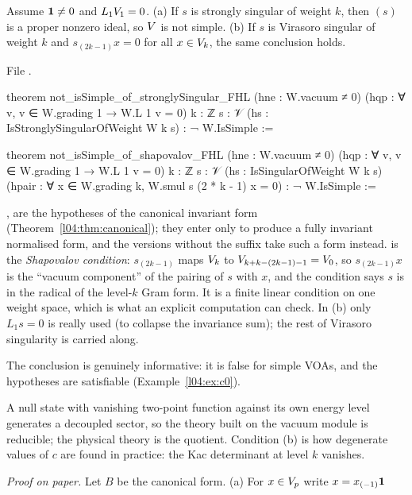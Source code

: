 \begin{theorem}\label{l04:thm:notsimple}
Assume $\mathbf{1}\ne0$ and $L_1V_1 = 0$. (a) If $s$ is strongly singular of weight $k$, then $(s)$ is
a proper nonzero ideal, so $V$ is not simple. (b) If $s$ is Virasoro singular of weight $k$ and
$s_{(2k-1)}x = 0$ for all $x\in V_k$, the same conclusion holds.
\end{theorem}
\noindent File .
\begin{leancode}
theorem not_isSimple_of_stronglySingular_FHL (hne : W.vacuum ≠ 0)
    (hqp : ∀ v, v ∈ W.grading 1 → W.L 1 v = 0) {k : ℤ} {s : 𝒱}
    (hs : IsStronglySingularOfWeight W k s) : ¬ W.IsSimple :=

theorem not_isSimple_of_shapovalov_FHL (hne : W.vacuum ≠ 0)
    (hqp : ∀ v, v ∈ W.grading 1 → W.L 1 v = 0) {k : ℤ} {s : 𝒱} (hs : IsSingularOfWeight W k s)
    (hpair : ∀ x ∈ W.grading k, W.smul s (2 * k - 1) x = 0) : ¬ W.IsSimple :=
\end{leancode}
\begin{dictionary}
,  are the hypotheses of the canonical invariant form
(Theorem~\ref{l04:thm:canonical}); they enter only to produce a fully invariant normalised form, and
the versions without the suffix  take such a form  instead.  is the
\emph{Shapovalov condition}: $s_{(2k-1)}$ maps $V_k$ to $V_{k+k-(2k-1)-1} = V_0$, so
$s_{(2k-1)}x$ is the ``vacuum component'' of the pairing of $s$ with $x$, and the condition says $s$ is
in the radical of the level-$k$ Gram form. It is a finite linear condition on one weight space, which
is what an explicit computation can check. In (b) only $L_1s = 0$ is really used (to collapse the
invariance sum); the rest of Virasoro singularity is carried along.

The conclusion  is genuinely informative: it is false for simple VOAs, and the
hypotheses are satisfiable (Example~\ref{l04:ex:c0}).
\end{dictionary}
\begin{physics}
A null state with vanishing two-point function against its own energy level generates a decoupled
sector, so the theory built on the vacuum module is reducible; the physical theory is the quotient.
Condition (b) is how degenerate values of $c$ are found in practice: the Kac determinant at level $k$
vanishes.
\end{physics}
\emph{Proof on paper.} Let $B$ be the canonical form. (a) For $x\in V_p$ write $x = x_{(-1)}\mathbf{1}$
